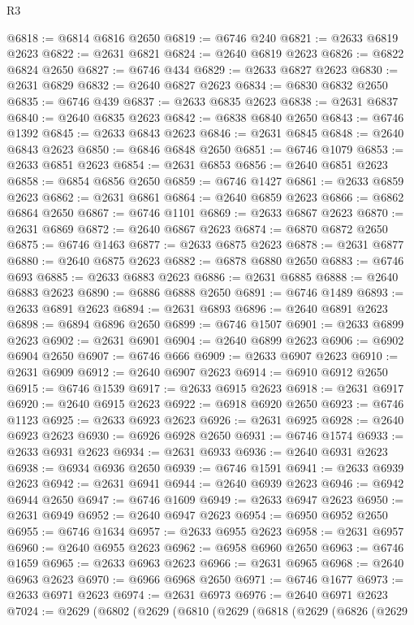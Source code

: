\begin{lexlean}{R3}
\begin{coremodule}
@6818 := @6814 @6816 @2650
@6819 := @6746 @240
@6821 := @2633 @6819 @2623
@6822 := @2631 @6821
@6824 := @2640 @6819 @2623
@6826 := @6822 @6824 @2650
@6827 := @6746 @434
@6829 := @2633 @6827 @2623
@6830 := @2631 @6829
@6832 := @2640 @6827 @2623
@6834 := @6830 @6832 @2650
@6835 := @6746 @439
@6837 := @2633 @6835 @2623
@6838 := @2631 @6837
@6840 := @2640 @6835 @2623
@6842 := @6838 @6840 @2650
@6843 := @6746 @1392
@6845 := @2633 @6843 @2623
@6846 := @2631 @6845
@6848 := @2640 @6843 @2623
@6850 := @6846 @6848 @2650
@6851 := @6746 @1079
@6853 := @2633 @6851 @2623
@6854 := @2631 @6853
@6856 := @2640 @6851 @2623
@6858 := @6854 @6856 @2650
@6859 := @6746 @1427
@6861 := @2633 @6859 @2623
@6862 := @2631 @6861
@6864 := @2640 @6859 @2623
@6866 := @6862 @6864 @2650
@6867 := @6746 @1101
@6869 := @2633 @6867 @2623
@6870 := @2631 @6869
@6872 := @2640 @6867 @2623
@6874 := @6870 @6872 @2650
@6875 := @6746 @1463
@6877 := @2633 @6875 @2623
@6878 := @2631 @6877
@6880 := @2640 @6875 @2623
@6882 := @6878 @6880 @2650
@6883 := @6746 @693
@6885 := @2633 @6883 @2623
@6886 := @2631 @6885
@6888 := @2640 @6883 @2623
@6890 := @6886 @6888 @2650
@6891 := @6746 @1489
@6893 := @2633 @6891 @2623
@6894 := @2631 @6893
@6896 := @2640 @6891 @2623
@6898 := @6894 @6896 @2650
@6899 := @6746 @1507
@6901 := @2633 @6899 @2623
@6902 := @2631 @6901
@6904 := @2640 @6899 @2623
@6906 := @6902 @6904 @2650
@6907 := @6746 @666
@6909 := @2633 @6907 @2623
@6910 := @2631 @6909
@6912 := @2640 @6907 @2623
@6914 := @6910 @6912 @2650
@6915 := @6746 @1539
@6917 := @2633 @6915 @2623
@6918 := @2631 @6917
@6920 := @2640 @6915 @2623
@6922 := @6918 @6920 @2650
@6923 := @6746 @1123
@6925 := @2633 @6923 @2623
@6926 := @2631 @6925
@6928 := @2640 @6923 @2623
@6930 := @6926 @6928 @2650
@6931 := @6746 @1574
@6933 := @2633 @6931 @2623
@6934 := @2631 @6933
@6936 := @2640 @6931 @2623
@6938 := @6934 @6936 @2650
@6939 := @6746 @1591
@6941 := @2633 @6939 @2623
@6942 := @2631 @6941
@6944 := @2640 @6939 @2623
@6946 := @6942 @6944 @2650
@6947 := @6746 @1609
@6949 := @2633 @6947 @2623
@6950 := @2631 @6949
@6952 := @2640 @6947 @2623
@6954 := @6950 @6952 @2650
@6955 := @6746 @1634
@6957 := @2633 @6955 @2623
@6958 := @2631 @6957
@6960 := @2640 @6955 @2623
@6962 := @6958 @6960 @2650
@6963 := @6746 @1659
@6965 := @2633 @6963 @2623
@6966 := @2631 @6965
@6968 := @2640 @6963 @2623
@6970 := @6966 @6968 @2650
@6971 := @6746 @1677
@6973 := @2633 @6971 @2623
@6974 := @2631 @6973
@6976 := @2640 @6971 @2623
@7024 := @2629
    (@6802
      (@2629
        (@6810
          (@2629
            (@6818
              (@2629
                (@6826
                  (@2629

\end{coremodule}
\end{lexlean}
